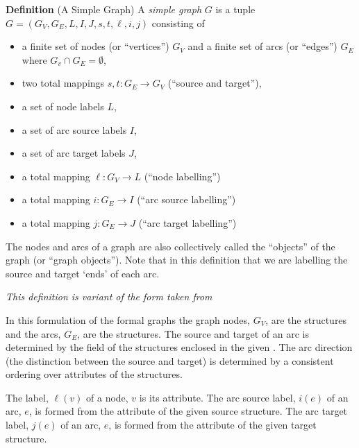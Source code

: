 \documentclass{cekarticle}
\begin{document}
\textbf{Definition} (A Simple Graph) A \emph{simple graph} $G$ is a
tuple $G = (G_{V}, G_{E}, L, I, J, s, t, \ell, i, j)$
consisting of
\begin{itemize}

\item a finite set of nodes (or ``vertices'') $G_{V}$ and a finite set of arcs (or ``edges'') $G_{E}$
        where $G_{v} \cap G_{E} = \emptyset$,

\item two total mappings $s, t : G_{E} \rightarrow G_{V}$ (``source and target''),

\item a set of node labels $L$,

\item a set of arc source labels $I$,

\item a set of arc target labels $J$,

\item a total mapping $\ell : G_{V} \rightarrow L$ (``node labelling'')

\item a total mapping $i : G_{E} \rightarrow I$ (``arc source labelling'')

\item a total mapping $j : G_{E} \rightarrow J$ (``arc target labelling'')

\end{itemize}
The nodes and arcs of a graph are also collectively called the
``objects'' of the graph (or ``graph objects'').  Note that in
this definition that we are labelling the source and target `ends'
of each arc.

\emph{This definition is variant of the form taken from
\citep{rudolf:1998}}

In this formulation of the formal graphs
the graph nodes, $G_{V}$, are the  structures and
the arcs, $G_{E}$, are the 
structures.  The source and target of an arc is determined by the  field
of the  structures enclosed in the given .
The arc direction (the distinction between the source and target) is determined by a consistent ordering
over  attributes of the  structures.

The label, $\ell(v)$ of a node, $v$ is its
 attribute.  The arc source label, $i(e)$ of an arc, $e$, is formed from the
 attribute of the given source  structure.
The arc target label, $j(e)$ of an arc, $e$, is formed from the
 attribute of the given target  structure.
\end{document}
